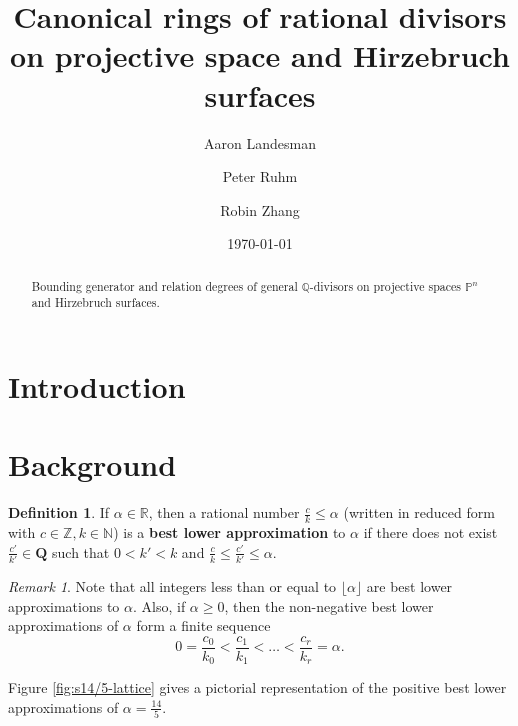 \documentclass{amsart}
\title{Canonical rings of rational divisors on projective space and Hirzebruch surfaces}
\author{Aaron Landesman}
\author{Peter Ruhm}
\author{Robin Zhang}
\date{\today}
\theoremstyle{plain}
\theoremstyle{definition}
\newtheorem{defn}[thm]{Definition}
\theoremstyle{remark}
\newtheorem{rem}[thm]{Remark}
\numberwithin{equation}{section}
\newcommand\bn{{\mathbb N}}
\newcommand\br{{\mathbb R}}
\newcommand\bq{{\mathbb Q}}
\newcommand\bp{{\mathbb P}}
\newcommand\bz{{\mathbb Z}}
\begin{document}
\begin{abstract}
 	Bounding generator and relation degrees of general $\bq$-divisors
	on projective spaces $\bp^n$ and Hirzebruch surfaces.
\end{abstract}

\maketitle


\section{Introduction}

\section{Background}

\begin{defn}
\label{defn:lower-approximation}
If $\alpha \in \br$, then a rational number $\frac{c}{k} \leq \alpha
$ (written in reduced form with $c \in \bz, k \in \bn$) is a
\textbf{best lower approximation} to $\alpha$ if there does not
exist $\frac{c'}{k'}\in \mathbf{Q}$ such that $0 < k'< k$ and
$\frac{c}{k} \le \frac{c'}{k'} \le \alpha$. 
\end{defn}

\begin{rem}
\label{rem:lower-approximation}
Note that all integers less than or equal to $\lfloor \alpha \rfloor$
are best lower approximations to $\alpha$. Also, if $\alpha \ge 0$,
then the non-negative best lower approximations of
$\alpha$ form a finite sequence
\[
	0 = \frac{c_0}{k_0} < \frac{c_1}{k_1} < \ldots < \frac{c_r}{k_r} = \alpha.
\]

\noindent
Figure \ref{fig:s14/5-lattice} gives a pictorial representation of the positive best lower approximations of $\alpha = \frac{14}{5}$.
\end{rem}
\end{document}
